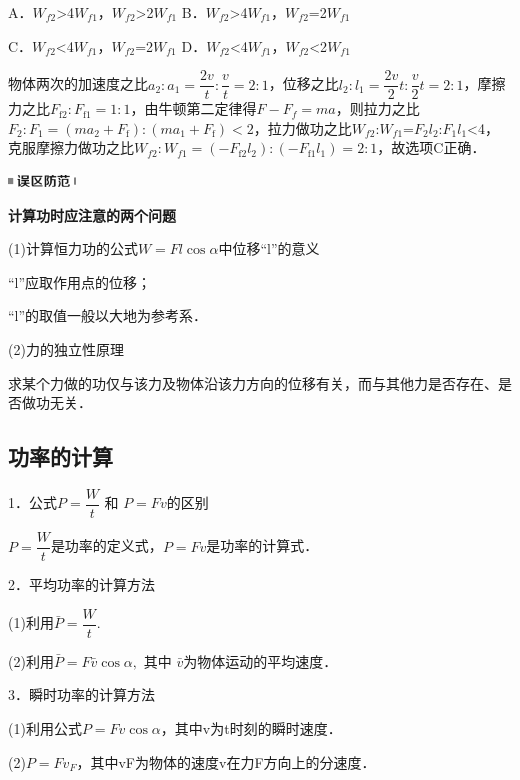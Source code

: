 \documentclass[cn,10.5pt,chinese,mac,chinesefont=founder]{elegantbook}
\begin{document}
A．$W_{f2}$\textgreater4$W_{f1}$，$W_{f2}$\textgreater2$W_{f1}$
B．$W_{f2}$\textgreater4$W_{f1}$，$W_{f2}$=2$W_{f1}$

C．$W_{f2}$\textless4$W_{f1}$，$W_{f2}$=2$W_{f1}$ D．$W_{f2}$\textless4$W_{f1}$，$W_{f2}$\textless2$W_{f1}$
\begin{solution}
	物体两次的加速度之比$a_{2}: a_{1}=\dfrac{2 v}{t}: \dfrac{v}{t}=2: 1$，位移之比$l_{2}: l_{1}=\dfrac{2 v}{2} t: \dfrac{v}{2} t=2: 1$，摩擦力之比$F_{\mathrm{f} 2}: F_{\mathrm{f} 1}=1: 1$，由牛顿第二定律得$F-F_f=ma$，则拉力之比$F_{2}: F_{1}=\left(m a_{2}+F_{\mathrm{f}}\right):\left(m a_{1}+F_{\mathrm{f}}\right)<2$，拉力做功之比$W_{f2}$:$W_{f1}$=$F_2$$l_2$:$F_1$$l_1$\textless4，克服摩擦力做功之比$W_{f2}:W_{f1}=\left(-F_{\mathrm{f} 2} l_{2}\right):\left(-F_{\mathrm{f} 1} l_{1}\right)=2: 1$，故选项C正确．
\end{solution}


\begin{center}\includegraphics[width=0.70833in,height=0.125in]{media/image34.png}

\textbf{计算功时应注意的两个问题}
\end{center}


(1)计算恒力功的公式$W=Fl\cos \alpha$中位移``l''的意义

``l''应取作用点的位移；

``l''的取值一般以大地为参考系．

(2)力的独立性原理

求某个力做的功仅与该力及物体沿该力方向的位移有关，而与其他力是否存在、是否做功无关．
\subsection{功率的计算}

1．公式$P=\dfrac{W}{t}$ 和 $P=F v$的区别

$P=\dfrac{W}{t}$是功率的定义式，$P=F v$是功率的计算式．

2．平均功率的计算方法

(1)利用$\bar{P}=\dfrac{W}{t}$.

(2)利用$\bar{P}=F \bar{v} \cos \alpha,$ 其中 $\bar{v}$为物体运动的平均速度．

3．瞬时功率的计算方法

(1)利用公式$P=Fv\cos \alpha$，其中v为t时刻的瞬时速度．

(2)$P=F v_{F}$，其中vF为物体的速度v在力F方向上的分速度．
\end{document}
